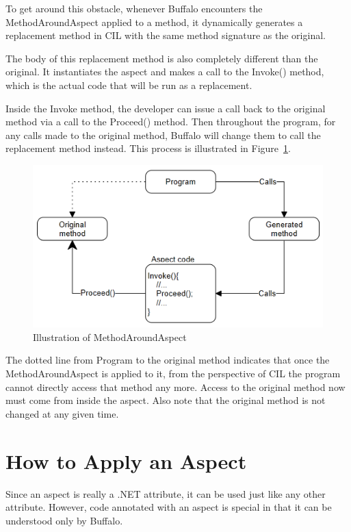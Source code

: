 To get around this obstacle, whenever Buffalo encounters the MethodAroundAspect applied to a method, it dynamically generates a replacement method in CIL with the same method signature as the original.

The body of this replacement method is also completely different than the original. It instantiates the aspect and makes a call to the Invoke() method, which is the actual code that will be run as a replacement. 

Inside the Invoke method, the developer can issue a call back to the original method via a call to the Proceed() method. Then throughout the program, for any calls made to the original method, Buffalo will change them to call the replacement method instead. This process is illustrated in Figure~\ref{around_overview}.

\begin{figure}[H]
  \includegraphics[scale=1.0]{AroundOverview3.PNG}
  \centering
  \caption{Illustration of MethodAroundAspect\label{around_overview}}
\end{figure}

The dotted line from Program to the original method indicates that once the MethodAroundAspect is applied to it, from the perspective of CIL the program cannot directly access that method any more. Access to the original method now must come from inside the aspect. Also note that the original method is not changed at any given time.


\section{How to Apply an Aspect}

Since an aspect is really a .NET attribute, it can be used just like any other attribute. However, code annotated with an aspect is special in that it can be understood only by Buffalo.

